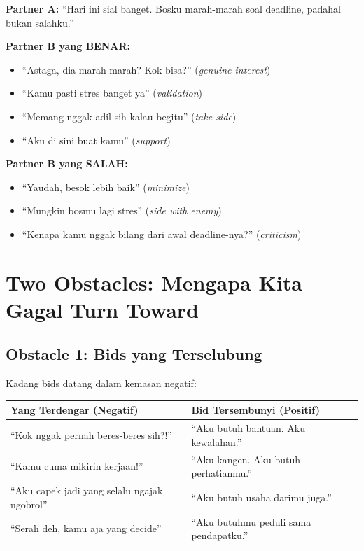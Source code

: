 \begin{praktikbox}
\textbf{Partner A:} ``Hari ini sial banget. Bosku marah-marah soal deadline, padahal bukan salahku.''

\textbf{Partner B yang BENAR:}
\begin{itemize}
    \item ``Astaga, dia marah-marah? Kok bisa?'' (\textit{genuine interest})
    \item ``Kamu pasti stres banget ya'' (\textit{validation})
    \item ``Memang nggak adil sih kalau begitu'' (\textit{take side})
    \item ``Aku di sini buat kamu'' (\textit{support})
\end{itemize}

\textbf{Partner B yang SALAH:}
\begin{itemize}
    \item ``Yaudah, besok lebih baik'' (\textit{minimize})
    \item ``Mungkin bosmu lagi stres'' (\textit{side with enemy})
    \item ``Kenapa kamu nggak bilang dari awal deadline-nya?'' (\textit{criticism})
\end{itemize}
\end{praktikbox}

\section{Two Obstacles: Mengapa Kita Gagal Turn Toward}

\subsection{Obstacle 1: Bids yang Terselubung}

Kadang bids datang dalam kemasan negatif:

\begin{center}
\renewcommand{\arraystretch}{1.4}
\begin{tabular}{|>{\raggedright}p{6cm}|>{\raggedright\arraybackslash}p{9cm}|}
\hline
\rowcolor{accent!20}
\textbf{Yang Terdengar (Negatif)} & \textbf{Bid Tersembunyi (Positif)} \\
\hline
``Kok nggak pernah beres-beres sih?!'' & ``Aku butuh bantuan. Aku kewalahan.'' \\
\hline
``Kamu cuma mikirin kerjaan!'' & ``Aku kangen. Aku butuh perhatianmu.'' \\
\hline
``Aku capek jadi yang selalu ngajak ngobrol'' & ``Aku butuh usaha darimu juga.'' \\
\hline
``Serah deh, kamu aja yang decide'' & ``Aku butuhmu peduli sama pendapatku.'' \\
\hline
\end{tabular}
\end{center}

